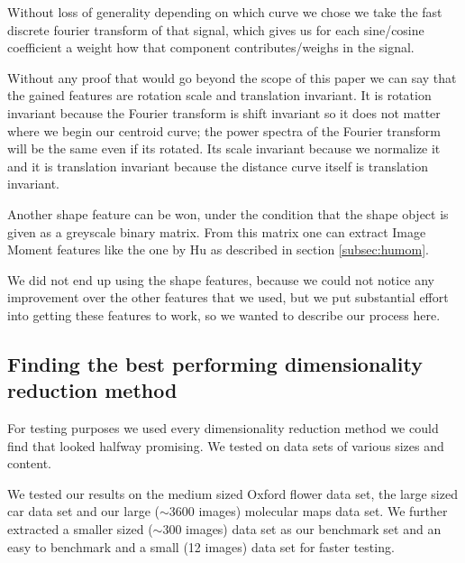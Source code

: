 \documentclass[journal]{vgtc}       %
\newcommand{\todo}[1]{\textcolor{red}{\textbf{TODO:} #1}}
\begin{document}
Without loss of generality depending on which curve we chose we take the fast discrete fourier transform of that signal, which gives us for each sine/cosine coefficient a weight how that component contributes/weighs in the signal.

Without any proof that would go beyond the scope of this paper we can say that the gained features are rotation scale and translation invariant. It is rotation invariant because the Fourier transform is shift invariant so it does not matter where we begin our centroid curve; the power spectra of the Fourier transform will be the same even if its rotated. Its scale invariant because we normalize it and it is translation invariant because the distance curve itself is  translation invariant.

Another shape feature can be won, under the condition that the shape object is given as a greyscale binary matrix. From this matrix one can extract Image Moment features like the one by Hu as described in section \ref{subsec:humom}.

We did not end up using the shape features, because we could not notice any improvement over the other features that we used, but we put substantial effort into getting these features to work, so we wanted to describe our process here.




\subsection{Finding the best performing  dimensionality reduction method}\label{subsec:dimred}
For testing purposes we used every dimensionality reduction method we could find that looked halfway promising. We tested on data sets of various sizes and content.

We tested our results on the medium sized Oxford flower data set\cite{flower}, the large sized car  \cite{stanfordcar}data set and our large ($\sim$3600 images) molecular maps data set. 
We further extracted a smaller sized ($\sim$300 images) data set as our benchmark set  and an easy to benchmark and a small (12 images) data set for faster testing. 
\end{document}
